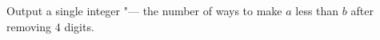 Output a single integer "--- the number of ways to make $a$ less than $b$ after removing $4$ digits.
